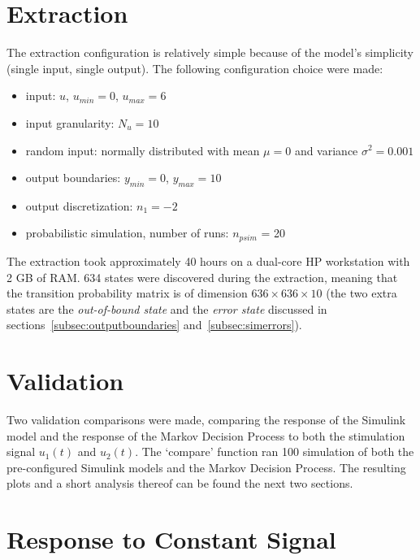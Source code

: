 \section{Extraction}
\label{sec:resultsextraction}

The extraction configuration is relatively simple because of the model's simplicity (single input, single output). The following configuration choice were made:

\begin{itemize}
\item input: $u$, $u_{min} = 0$, $u_{max} = 6$
\item input granularity: $N_{u}=10$
\item random input: normally distributed with mean $\mu=0$ and variance $\sigma^2 = 0.001$
\item output boundaries: $y_{min}=0$, $y_{max}=10$
\item output discretization: $n_1=-2$
\item probabilistic simulation, number of runs: $n_{psim}$ = 20
\end{itemize}

The extraction took approximately 40 hours on a dual-core HP workstation with 2 GB of RAM. 634 states were discovered during the extraction, meaning that the transition probability matrix is of dimension $636\times636\times10$ (the two extra states are the \textit{out-of-bound state} and the \textit{error state} discussed in sections~\ref{subsec:outputboundaries} and~\ref{subsec:simerrors}).

\section{Validation}

Two validation comparisons were made, comparing the response of the Simulink model and the response of the Markov Decision Process to both the stimulation signal $u_1(t)$ and $u_2(t)$. The `compare' function ran 100 simulation of both the pre-configured Simulink models and the Markov Decision Process. The resulting plots and a short analysis thereof can be found the next two sections.

\section{Response to Constant Signal}
\label{sec:respconst}

